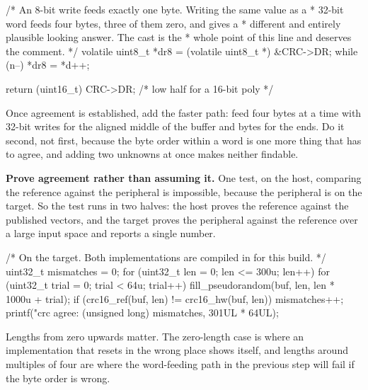 \begin{steps}
\begin{ccode}
{    /* An 8-bit write feeds exactly one byte. Writing the same value as a
     * 32-bit word feeds four bytes, three of them zero, and gives a
     * different and entirely plausible looking answer. The cast is the
     * whole point of this line and deserves the comment. */
    volatile uint8_t *dr8 = (volatile uint8_t *) &CRC->DR;
    while (n--)
        *dr8 = *d++;

    return (uint16_t) CRC->DR;            /* low half for a 16-bit poly   */
}
\end{ccode}
Once agreement is established, add the faster path: feed four bytes at a time
with 32-bit writes for the aligned middle of the buffer and bytes for the ends.
Do it second, not first, because the byte order within a word is one more thing
that has to agree, and adding two unknowns at once makes neither findable.

\item \textbf{Prove agreement rather than assuming it.} One test, on the host,
comparing the reference against the peripheral is impossible, because the
peripheral is on the target. So the test runs in two halves: the host proves the
reference against the published vectors, and the target proves the peripheral
against the reference over a large input space and reports a single number.
\begin{ccode}
/* On the target. Both implementations are compiled in for this build. */
uint32_t mismatches = 0;
for (uint32_t len = 0; len <= 300u; len++) {
    for (uint32_t trial = 0; trial < 64u; trial++) {
        fill_pseudorandom(buf, len, len * 1000u + trial);
        if (crc16_ref(buf, len) != crc16_hw(buf, len))
            mismatches++;
    }
}
printf("crc agree: %
       (unsigned long) mismatches, 301UL * 64UL);
\end{ccode}
Lengths from zero upwards matter. The zero-length case is where an
implementation that resets in the wrong place shows itself, and lengths around
multiples of four are where the word-feeding path in the previous step will fail
if the byte order is wrong.


\end{steps}
